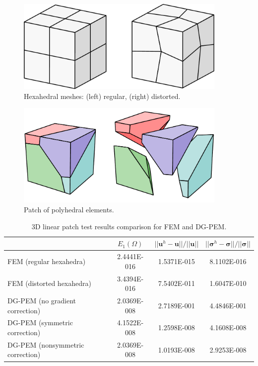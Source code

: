 \begin{figure}[!h]
    \centering
    \includegraphics[width=4.0in]{figures/hexahedral_patch_meshes.pdf}
    	\caption{Hexahedral meshes: (left) regular, (right) distorted.}
    \label{fig:hexahedral_patch_meshes}
\end{figure}

\begin{figure}[!h]
    \centering
    \includegraphics[width=4.0in]{figures/polyhedral_patch_mesh.pdf}
    	\caption{Patch of polyhedral elements.}
    \label{fig:polyhedral_patch_mesh}
\end{figure}

\begin{table}[!ht]
  \begin{center}
    \begin{tabular}{| l || c | c | c |}
    \hline
           & $E_1 (\Omega)$ & $||\mathbf{u}^h - \mathbf{u}|| / ||\mathbf{u}||$ & $||\boldsymbol{\sigma}^h - \boldsymbol{\sigma}|| / ||\boldsymbol{\sigma}||$ \\ \hline \hline
    FEM (regular hexahedra) & 2.4441E-016 & 1.5371E-015 & 8.1102E-016 \\ \hline
    FEM (distorted hexahedra) & 3.4394E-016 & 7.5402E-011 & 1.6047E-010 \\ \hline
    DG-PEM (no gradient correction) & 2.0369E-008 & 2.7189E-001 & 4.4846E-001 \\ \hline
    DG-PEM (symmetric correction) & 4.1522E-008 & 1.2598E-008 & 4.1608E-008 \\ \hline
    DG-PEM (nonsymmetric correction) & 2.0369E-008 & 1.0193E-008 & 2.9253E-008 \\
    \hline
    \end{tabular}
    \caption{3D linear patch test results comparison for FEM and DG-PEM.}
    \vspace{-5pt}
    \label{tab:linear_patch_test_3d}
    \vspace{-10pt}
  \end{center}
\end{table}

